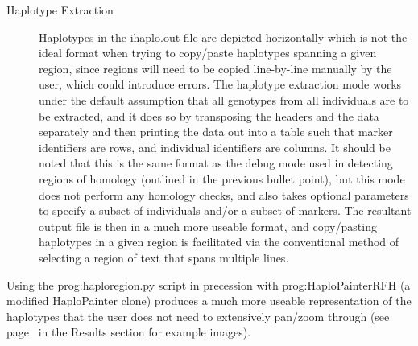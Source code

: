 \begin{description}
\item[Haplotype Extraction]{Haplotypes in the ihaplo.out file are depicted horizontally which is not the ideal format when trying to copy/paste haplotypes spanning a given region, since regions will need to be copied line-by-line manually by the user, which could introduce errors. The haplotype extraction mode works under the default assumption that all genotypes from all individuals are to be extracted, and it does so by transposing the headers and the data separately and then printing the data out into a table such that marker identifiers are rows, and individual identifiers are columns. It should be noted that this is the same format as the debug mode used in detecting regions of homology (outlined in the previous bullet point), but this mode does not perform any homology checks, and also takes optional parameters to specify a subset of individuals and/or a subset of markers. The resultant output file is then in a much more useable format, and copy/pasting haplotypes in a given region is facilitated via the conventional method of selecting a region of text that spans multiple lines.}
\end{description}

Using the \gls{prog:haploregion.py} script in precession with \gls{prog:HaploPainterRFH} (a modified HaploPainter clone) produces a much more useable representation of the haplotypes that the user does not need to extensively pan/zoom through (see page~\pageref{ref:res:hapcomp} in the Results section for example images).

\pagebreak
\begin{spacing}{1.315}
\printglossary[type=prog]\label{ref:meth:proglist}
\end{spacing}
